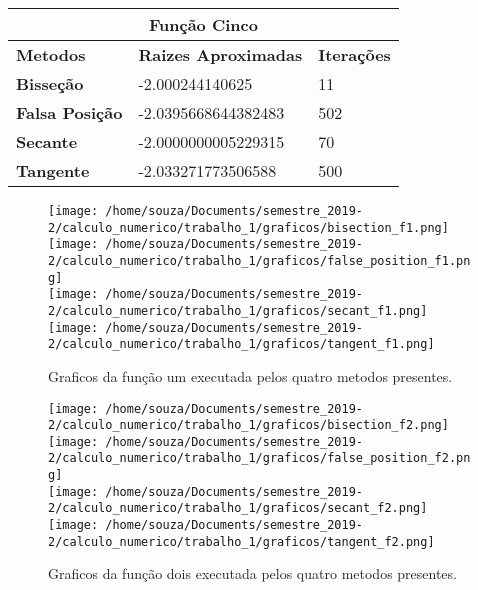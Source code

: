 \documentclass[12pt]{article}
\begin{document}
\begin{table}[]
\begin{tabular}{lll}
\multicolumn{3}{c}{\textbf{Função Cinco}}                                                                           \\ \hline
\multicolumn{1}{l|}{\textbf{Metodos}}       & \multicolumn{1}{l|}{\textbf{Raizes Aproximadas}} & \textbf{Iterações} \\ \hline
\multicolumn{1}{l|}{\textbf{Bisseção}}      & \multicolumn{1}{l|}{-2.000244140625}             & 11                 \\ \hline
\multicolumn{1}{l|}{\textbf{Falsa Posição}} & \multicolumn{1}{l|}{-2.0395668644382483}         & 502                \\ \hline
\multicolumn{1}{l|}{\textbf{Secante}}       & \multicolumn{1}{l|}{-2.0000000005229315}         & 70                 \\ \hline
\multicolumn{1}{l|}{\textbf{Tangente}}      & \multicolumn{1}{l|}{-2.033271773506588}          & 500               
\end{tabular}
\end{table}

\begin{figure}[!h]
    \centering
    \texttt{[image: /home/souza/Documents/semestre\_2019-2/calculo\_numerico/trabalho\_1/graficos/bisection\_f1.png]}
    \texttt{[image: /home/souza/Documents/semestre\_2019-2/calculo\_numerico/trabalho\_1/graficos/false\_position\_f1.png]}\\
    \texttt{[image: /home/souza/Documents/semestre\_2019-2/calculo\_numerico/trabalho\_1/graficos/secant\_f1.png]}
    \texttt{[image: /home/souza/Documents/semestre\_2019-2/calculo\_numerico/trabalho\_1/graficos/tangent\_f1.png]}
    \caption{Graficos da função um executada pelos quatro metodos presentes.}
\end{figure}

\begin{figure}[!h]
    \centering
    \texttt{[image: /home/souza/Documents/semestre\_2019-2/calculo\_numerico/trabalho\_1/graficos/bisection\_f2.png]}
    \texttt{[image: /home/souza/Documents/semestre\_2019-2/calculo\_numerico/trabalho\_1/graficos/false\_position\_f2.png]}\\
    \texttt{[image: /home/souza/Documents/semestre\_2019-2/calculo\_numerico/trabalho\_1/graficos/secant\_f2.png]}
    \texttt{[image: /home/souza/Documents/semestre\_2019-2/calculo\_numerico/trabalho\_1/graficos/tangent\_f2.png]}
    \caption{Graficos da função dois executada pelos quatro metodos presentes.}
\end{figure}
\end{document}
